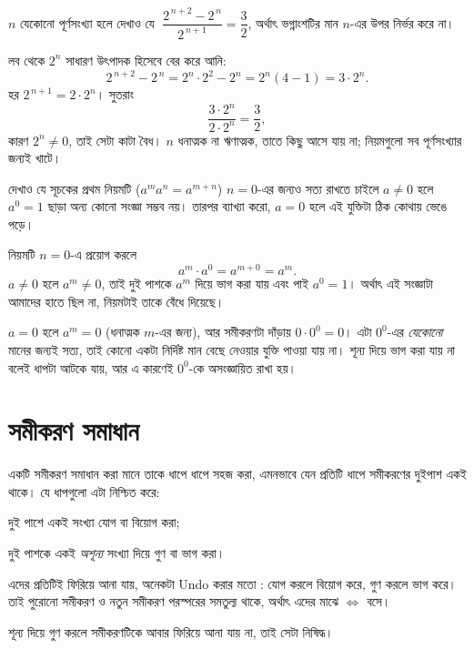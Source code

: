 \documentclass[11pt]{article}
\begin{document}
 $n$ যেকোনো পূর্ণসংখ্যা হলে দেখাও যে
$\;\dfrac{2^{\,n+2} - 2^{\,n}}{2^{\,n+1}} = \dfrac{3}{2}$, অর্থাৎ ভগ্নাংশটির মান
$n$-এর উপর নির্ভর করে না।

\begin{sol}
লব থেকে $2^{n}$ সাধারণ উৎপাদক হিসেবে বের করে আনি:
\[
  2^{\,n+2} - 2^{\,n} = 2^{n} \cdot 2^{2} - 2^{n} = 2^{n}(4 - 1) = 3 \cdot 2^{n} .
\]
হর $2^{\,n+1} = 2 \cdot 2^{n}$। সুতরাং
\[
  \frac{3 \cdot 2^{n}}{2 \cdot 2^{n}} = \frac{3}{2},
\]
কারণ $2^{n} \neq 0$, তাই সেটা কাটা বৈধ। $n$ ধনাত্মক না ঋণাত্মক, তাতে কিছু আসে
যায় না; নিয়মগুলো সব পূর্ণসংখ্যার জন্যই খাটে।
\end{sol}

 দেখাও যে সূচকের প্রথম নিয়মটি ($a^{m}a^{n} = a^{m+n}$) $n = 0$-এর জন্যও
সত্য রাখতে চাইলে $a \neq 0$ হলে $a^{0} = 1$ ছাড়া অন্য কোনো সংজ্ঞা সম্ভব নয়।
তারপর ব্যাখ্যা করো, $a = 0$ হলে এই যুক্তিটা ঠিক কোথায় ভেঙে পড়ে।

\begin{sol}
নিয়মটি $n = 0$-এ প্রয়োগ করলে
\[
  a^{m} \cdot a^{0} = a^{m + 0} = a^{m} .
\]
$a \neq 0$ হলে $a^{m} \neq 0$, তাই দুই পাশকে $a^{m}$ দিয়ে ভাগ করা যায় এবং পাই
$a^{0} = 1$। অর্থাৎ এই সংজ্ঞাটা আমাদের হাতে ছিল না, নিয়মটাই তাকে বেঁধে দিয়েছে।

\noindent $a = 0$ হলে $a^{m} = 0$ (ধনাত্মক $m$-এর জন্য), আর সমীকরণটা দাঁড়ায়
$0 \cdot 0^{0} = 0$। এটা $0^{0}$-এর \emph{যেকোনো} মানের জন্যই সত্য, তাই কোনো
একটা নির্দিষ্ট মান বেছে নেওয়ার যুক্তি পাওয়া যায় না। শূন্য দিয়ে ভাগ করা যায় না বলেই
ধাপটা আটকে যায়, আর এ কারণেই $0^{0}$-কে অসংজ্ঞায়িত রাখা হয়।
\end{sol}

\section{সমীকরণ সমাধান}

\begin{idea}[দুই পাশে একই কাজ করা]
একটি সমীকরণ সমাধান করা মানে তাকে ধাপে ধাপে সহজ করা, এমনভাবে যেন প্রতিটি ধাপে
সমীকরণের দুইপাশ একই থাকে। যে ধাপগুলো এটা নিশ্চিত করে:

\medskip
দুই পাশে একই সংখ্যা যোগ বা বিয়োগ করা;

দুই পাশকে একই \emph{অশূন্য} সংখ্যা দিয়ে গুণ বা ভাগ করা।

\medskip
এদের প্রতিটিই ফিরিয়ে আনা যায়, অনেকটা Undo করার মতো : যোগ করলে বিয়োগ করে, গুণ করলে ভাগ করে। তাই
পুরোনো সমীকরণ ও নতুন সমীকরণ পরস্পরের সমতুল্য থাকে, অর্থাৎ এদের মাঝে $\Leftrightarrow$
বসে।

শূন্য দিয়ে গুণ করলে সমীকরণটিকে আবার ফিরিয়ে আনা যায় না, তাই সেটা নিষিদ্ধ।
\end{idea}
\end{document}
